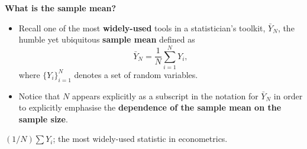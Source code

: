\documentclass[
  letterpaper,
  DIV=11,
  numbers=noendperiod]{scrartcl}
\newcommand{\slidelabel}[1]{{\color{embernavy}\bfseries\large #1\par\vspace{5pt}}}
\newenvironment{slidefooter}{%
  \par\vspace{7pt}{\color{emberrule}\rule{\linewidth}{0.4pt}}\par\vspace{4pt}%
  \color{emberamber}\itshape\small}{\par}
\begin{document}
\begin{slidebox}

\slidelabel{What is the sample mean?}

\begin{itemize}
\item
  Recall one of the most \textbf{widely-used} tools in a statistician's
  toolkit, \(\bar{Y}_N\), the humble yet ubiquitous \textbf{sample mean}
  defined as \[\bar{Y}_N = \frac{1}{N}\sum_{i=1}^{N} Y_i,\] where
  \(\{Y_i\}_{i=1}^{N}\) denotes a set of random variables.
\item
  Notice that \(N\) appears explicitly as a subscript in the notation
  for \(\bar{Y}_N\) in order to explicitly emphasise the
  \textbf{dependence of the sample mean on the sample size}.
\end{itemize}

\begin{slidefooter}

\((1/N)\sum Y_i\); the most widely-used statistic in econometrics.

\end{slidefooter}

\end{slidebox}
\end{document}
